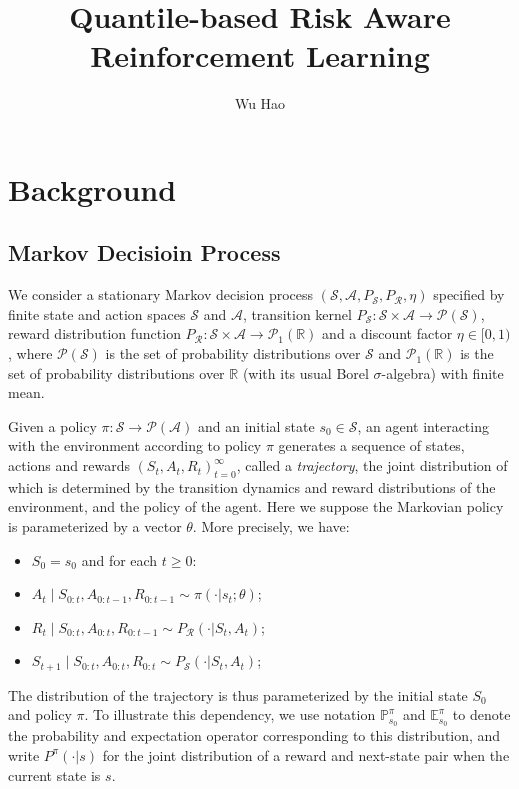 


\usepackage{amsmath}
\usepackage{xcolor}
\usepackage{float}
\usepackage{algorithm}
\usepackage{algorithmic}
\usepackage[fontset=ubuntu]{ctex}





\title{Quantile-based Risk Aware Reinforcement Learning}
\author{Wu Hao}
\maketitle

\section{Background}
\subsection{Markov Decisioin Process}

We consider a stationary Markov decision process $(\mathcal{S},\mathcal{A},P_{\mathcal{S}},P_{\mathcal{R}},\eta)$ specified by finite state and action spaces $\mathcal{S}$ and $\mathcal{A}$, transition kernel $P_{\mathcal{S}}:\mathcal{S}\times\mathcal{A}\rightarrow\mathcal{P}(\mathcal{S})$, reward distribution function $P_{\mathcal{R}}:\mathcal{S}\times\mathcal{A}\rightarrow\mathcal{P}_1(\mathbb{R})$ and a discount factor $\eta\in[0,1)$, where $\mathcal{P}(\mathcal{S})$ is the set of probability distributions over $\mathcal{S}$ and $\mathcal{P}_1(\mathcal{\mathbb{R}})$ is the set of probability distributions over $\mathbb{R}$ (with its usual Borel $\sigma$-algebra) with finite mean.

Given a policy $\pi: \mathcal{S}\rightarrow\mathcal{P}(\mathcal{A})$ and an initial state $s_0 \in \mathcal{S}$, an agent interacting with the environment according to policy $\pi$ generates a sequence of states, actions and rewards $(S_t,A_t,R_t)_{t=0}^{\infty}$, called a \textit{trajectory}, the joint distribution of which is determined by the transition dynamics and reward distributions of the environment, and the policy of the agent. Here we suppose the Markovian policy is parameterized by a vector $\theta$. More precisely, we have:
\begin{itemize}
    \item $S_0=s_0$ and for each $t\geq0$:
    \item $A_t\mid S_{0:t},A_{0:t-1},R_{0:t-1} \sim \pi(\cdot|s_t;\theta)$;
    \item $R_t\mid S_{0:t},A_{0:t},R_{0:t-1} \sim P_{\mathcal{R}}(\cdot|S_t, A_t)$;
    \item $S_{t+1}\mid S_{0:t},A_{0:t},R_{0:t} \sim P_{\mathcal{S}}(\cdot|S_t,A_t)$;
\end{itemize}
The distribution of the trajectory is thus parameterized by the initial state $S_0$ and policy $\pi$. To illustrate this dependency, we use notation $\mathbb{P}_{s_0}^{\pi}$ and $\mathbb{E}_{s_0}^{\pi}$ to denote the probability and expectation operator corresponding to this distribution, and write $P^{\pi}(\cdot|s)$ for the joint distribution of a reward and next-state pair when the current state is $s$.

